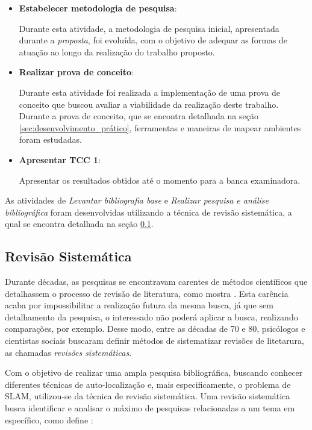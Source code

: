 \begin{itemize}
	\item \textbf{Estabelecer metodologia de pesquisa}:

		Durante esta atividade, a metodologia de pesquisa inicial, apresentada durante a \textit{proposta}, foi evoluída, com o objetivo de adequar as formas de atuação ao longo da realização do trabalho proposto. 

	\item \textbf{Realizar prova de conceito}:

		Durante esta atividade foi realizada a implementação de uma prova de conceito que buscou avaliar a viabilidade da realização deste trabalho. Durante a prova de conceito, que se encontra detalhada na seção \ref{sec:desenvolvimento_prático}, ferramentas e maneiras de mapear ambientes foram estudadas.

	\item \textbf{Apresentar TCC 1}:

		Apresentar os resultados obtidos até o momento para a banca examinadora.
\end{itemize}

As atividades de \textit{Levantar bibliografia base} e \textit{Realizar pesquisa e análise bibliográfica} foram desenvolvidas utilizando a técnica de revisão sistemática, a qual se encontra detalhada na seção \ref{sec:revisao_sistematica}.

\subsection{Revisão Sistemática} %
\label{sec:revisao_sistematica}

	Durante décadas, as pesquisas se encontravam carentes de métodos científicos que detalhassem o processo de revisão de literatura, como mostra \cite{Kitchenham}. Esta carência acaba por impossibilitar a realização futura da mesma busca, já que sem detalhamento da pesquisa, o interessado não poderá aplicar a busca, realizando comparações, por exemplo. Desse modo, entre as décadas de 70 e 80, psicólogos e cientistas sociais buscaram definir métodos de sistematizar revisões de litetarura, as chamadas \textit{revisões sistemáticas}.  
	
	Com o objetivo de realizar uma ampla pesquisa bibliográfica, buscando conhecer diferentes técnicas de auto-localização e, mais especificamente, o problema de SLAM, utilizou-se da técnica de revisão sistemática. Uma revisão sistemática busca identificar e analisar o máximo de pesquisas relacionadas a um tema em específico, como define \cite[p. 8]{revisaoSistematicaComunicacao}:

